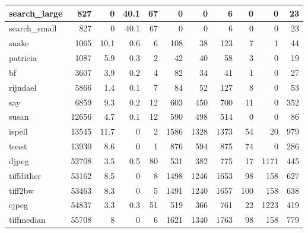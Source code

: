 \begin{tabular}{|l|r|r|r|r|r|r|r|r|r|r|}
\hline
 search\_large    &            827 &      0   &   40.1 &   67 &      0 &          0 &            6 &     0 &     0 &    23 \\
\hline
 search\_small    &            827 &      0   &   40.1 &   67 &      0 &          0 &            6 &     0 &     0 &    23 \\
\hline
 snake           &           1065 &     10.1 &    0.6 &    6 &    108 &         38 &          123 &     7 &     1 &    44 \\
\hline
 patricia        &           1087 &      5.9 &    0.3 &    2 &     42 &         40 &           58 &     3 &     0 &    19 \\
\hline
 bf              &           3607 &      3.9 &    0.2 &    4 &     82 &         34 &           41 &     1 &     0 &    27 \\
\hline
 rijndael        &           5866 &      1.4 &    0.1 &    7 &     84 &         52 &          127 &     8 &     0 &    53 \\
\hline
 say             &           6859 &      9.3 &    0.2 &   12 &    603 &        450 &          700 &    11 &     0 &   352 \\
\hline
 susan           &          12656 &      4.7 &    0.1 &   12 &    590 &        498 &          514 &     0 &     0 &    86 \\
\hline
 ispell          &          13545 &     11.7 &    0   &    2 &   1586 &       1328 &         1373 &    54 &    20 &   979 \\
\hline
 toast           &          13930 &      8.6 &    0   &    1 &    876 &        594 &          875 &    74 &     0 &   286 \\
\hline
 djpeg           &          52708 &      3.5 &    0.5 &   80 &    531 &        382 &          775 &    17 &  1171 &   445 \\
\hline
 tiffdither      &          53162 &      8.5 &    0   &    8 &   1498 &       1246 &         1653 &    98 &   158 &   627 \\
\hline
 tiff2bw         &          53463 &      8.3 &    0   &    5 &   1491 &       1240 &         1657 &   100 &   158 &   638 \\
\hline
 cjpeg           &          54837 &      3.3 &    0.3 &   51 &    519 &        366 &          761 &    22 &  1223 &   419 \\
\hline
 tiffmedian      &          55708 &      8   &    0   &    6 &   1621 &       1340 &         1763 &    98 &   158 &   779 \\
\hline
\end{tabular}

